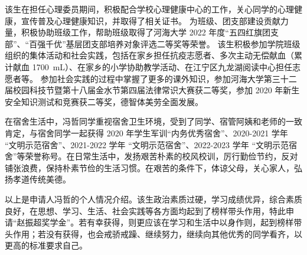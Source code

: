\documentclass[12pt]{ctexart}
\begin{document}
该生在担任心理委员期间，积极配合学校心理健康中心的工作，关心同学的心理健康，宣传普及心理健康知识，并取得了相关证书。
为班级、团支部建设贡献力量，积极协助班级工作，帮助班级取得了河海大学 2022 年度“五四红旗团支部”、“百强千优”基层团支部培养对象评选二等奖等荣誉。
该生积极参加学院班级组织的集体活动和社会实践，包括在家乡担任抗疫志愿者、多次主动无偿献血（累计献血 \SI{1700}{\milli\liter}）、在家乡的小学协助教学活动、在江宁区九龙湖阅读中心担任志愿者等。
参加社会实践的过程中掌握了更多的课外知识，参加河海大学第三十二届校园科技节暨第十八届金水节第四届法律常识大赛获二等奖，参加 2020 年新生安全知识测试和竞赛获二等奖，德智体美劳全面发展。

在宿舍生活中，冯哲同学重视宿舍卫生环境，受到了同学、宿管阿姨和老师的一致肯定，与宿舍同学一起获得 2020 年学生军训“内务优秀宿舍”、2020-2021 学年 “文明示范宿舍”、2021-2022 学年 “文明示范宿舍”、2022-2023 学年 “文明示范宿舍”等荣誉称号。在日常生活中，发扬艰苦朴素的校风校训，厉行勤俭节约，反对铺张浪费，保持朴素节俭的生活习惯。在艰苦的条件下，体谅父母，关心家人，弘扬孝道传统美德。

以上是申请人冯哲的个人情况介绍。该生政治素质过硬，学习成绩优异，综合素质良好，在思想、学习、生活、社会实践等各方面均起到了榜样带头作用，特此申请“赵振超奖学金”。若有幸获得，则更应该在学习和生活中以身作则，起到榜样带头作用；若没有获得，也会戒骄戒躁、继续努力，继续向其他优秀的同学看齐，以更高的标准要求自己。
\end{document}
